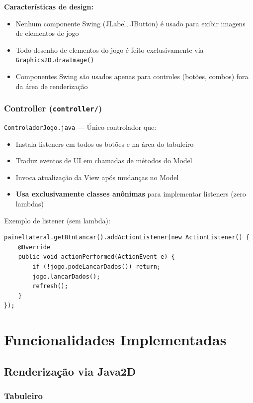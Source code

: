 \documentclass[12pt,a4paper]{report}
\begin{document}
\textbf{Características de design:}
\begin{itemize}
    \item Nenhum componente Swing (JLabel, JButton) é usado para exibir imagens de elementos de jogo
    \item Todo desenho de elementos do jogo é feito exclusivamente via \texttt{Graphics2D.drawImage()}
    \item Componentes Swing são usados apenas para controles (botões, combos) fora da área de renderização
\end{itemize}

\subsection{Controller (\texttt{controller/})}

\texttt{ControladorJogo.java} --- Único controlador que:

\begin{itemize}
    \item Instala listeners em todos os botões e na área do tabuleiro
    \item Traduz eventos de UI em chamadas de métodos do Model
    \item Invoca atualização da View após mudanças no Model
    \item \textbf{Usa exclusivamente classes anônimas} para implementar listeners (zero lambdas)
\end{itemize}

Exemplo de listener (sem lambda):
\begin{lstlisting}
painelLateral.getBtnLancar().addActionListener(new ActionListener() {
    @Override
    public void actionPerformed(ActionEvent e) {
        if (!jogo.podeLancarDados()) return;
        jogo.lancarDados();
        refresh();
    }
});
\end{lstlisting}

\chapter{Funcionalidades Implementadas}

\section{Renderização via Java2D}

\subsection{Tabuleiro}
\end{document}
